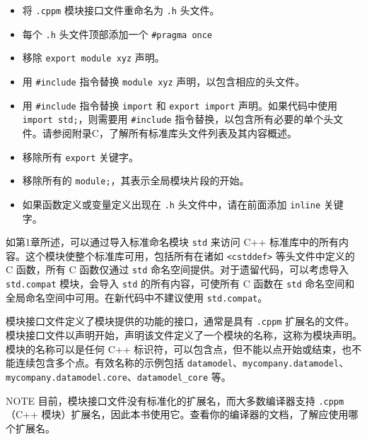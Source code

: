 \begin{itemize}
\item
将 \verb|.cppm| 模块接口文件重命名为 \verb|.h| 头文件。

\item
每个 \verb|.h| 头文件顶部添加一个 \verb|#pragma once|

\item
移除 \verb|export module xyz| 声明。

\item
用 \verb|#include| 指令替换 \verb|module xyz| 声明，以包含相应的头文件。

\item
用 \verb|#include| 指令替换 \verb|import| 和 \verb|export import| 声明。如果代码中使用 \verb|import std;|，则需要用 \verb|#include| 指令替换，以包含所有必要的单个头文件。请参阅附录C，了解所有标准库头文件列表及其内容概述。

\item
移除所有 \verb|export| 关键字。

\item
移除所有的 \verb|module;|，其表示全局模块片段的开始。

\item
如果函数定义或变量定义出现在 \verb|.h| 头文件中，请在前面添加 \verb|inline| 关键字。
\end{itemize}



如第1章所述，可以通过导入标准命名模块 \verb|std| 来访问 C++ 标准库中的所有内容。这个模块使整个标准库可用，包括所有在诸如 \verb|<cstddef>| 等头文件中定义的 C 函数，所有 C 函数仅通过 \verb|std| 命名空间提供。对于遗留代码，可以考虑导入 \verb|std.compat| 模块，会导入 \verb|std| 的所有内容，可使所有 C 函数在 \verb|std| 命名空间和全局命名空间中可用。在新代码中不建议使用 \verb|std.compat|。


模块接口文件定义了模块提供的功能的接口，通常是具有 \verb|.cppm| 扩展名的文件。模块接口文件以声明开始，声明该文件定义了一个模块的名称，这称为模块声明。模块的名称可以是任何 C++ 标识符，可以包含点，但不能以点开始或结束，也不能连续包含多个点。有效名称的示例包括 \verb|datamodel|、\verb|mycompany.datamodel|、\verb|mycompany.datamodel.core|、\verb|datamodel_core| 等。

\begin{myNotic}{NOTE}
目前，模块接口文件没有标准化的扩展名，而大多数编译器支持 \verb|.cppm|（C++ 模块）扩展名，因此本书使用它。查看你的编译器的文档，了解应使用哪个扩展名。
\end{myNotic}

